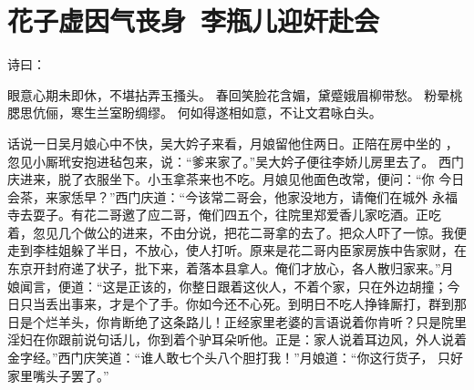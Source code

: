 \chapter{花子虚因气丧身~李瓶儿迎奸赴会}

诗曰：

眼意心期未即休，不堪拈弄玉搔头。
春回笑脸花含媚，黛蹙娥眉柳带愁。
粉晕桃腮思伉俪，寒生兰室盼绸缪。
何如得遂相如意，不让文君咏白头。

话说一日吴月娘心中不快，吴大妗子来看，月娘留他住两日。正陪在房中坐的
，忽见小厮玳安抱进毡包来，说：“爹来家了。”吴大妗子便往李娇儿房里去了。
西门庆进来，脱了衣服坐下。小玉拿茶来也不吃。月娘见他面色改常，便问：“你
今日会茶，来家恁早？”西门庆道：“今该常二哥会，他家没地方，请俺们在城外
永福寺去耍子。有花二哥邀了应二哥，俺们四五个，往院里郑爱香儿家吃酒。正吃
着，忽见几个做公的进来，不由分说，把花二哥拿的去了。把众人吓了一惊。我便
走到李桂姐躲了半日，不放心，使人打听。原来是花二哥内臣家房族中告家财，在
东京开封府递了状子，批下来，着落本县拿人。俺们才放心，各人散归家来。”月
娘闻言，便道：“这是正该的，你整日跟着这伙人，不着个家，只在外边胡撞；今
日只当丢出事来，才是个了手。你如今还不心死。到明日不吃人挣锋厮打，群到那
日是个烂羊头，你肯断绝了这条路儿！正经家里老婆的言语说着你肯听？只是院里
淫妇在你跟前说句话儿，你到着个驴耳朵听他。正是：家人说着耳边风，外人说着
金字经。”西门庆笑道：“谁人敢七个头八个胆打我！”月娘道：“你这行货子，
只好家里嘴头子罢了。”


